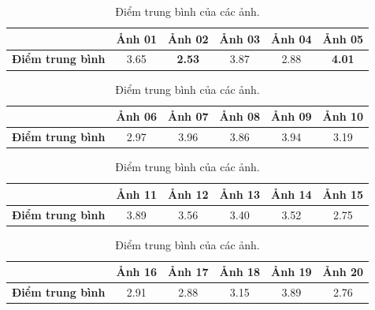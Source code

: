 \documentclass[a4paper, 12pt]{article}
\begin{document}
\begin{table}[!h]
\centering
\begin{tabular}{c|c|c|c|c|c|}
\cline{2-6}
                                               & \textbf{Ảnh 01} & \textbf{Ảnh 02} & \textbf{Ảnh 03} & \textbf{Ảnh 04} & \textbf{Ảnh 05} \\ \hline
\multicolumn{1}{|c|}{\textbf{Điểm trung bình}} & 3.65            & \textbf{2.53}            & 3.87            & 2.88            & \textbf{4.01}            \\ \hline
\end{tabular}

\begin{tabular}{c|c|c|c|c|c|}
\cline{2-6}
                                               & \textbf{Ảnh 06} & \textbf{Ảnh 07} & \textbf{Ảnh 08} & \textbf{Ảnh 09} & \textbf{Ảnh 10} \\ \hline
\multicolumn{1}{|c|}{\textbf{Điểm trung bình}} & 2.97            & 3.96            & 3.86            & 3.94            & 3.19            \\ \hline
\end{tabular}

\begin{tabular}{c|c|c|c|c|c|}
\cline{2-6}
                                               & \textbf{Ảnh 11} & \textbf{Ảnh 12} & \textbf{Ảnh 13} & \textbf{Ảnh 14} & \textbf{Ảnh 15} \\ \hline
\multicolumn{1}{|c|}{\textbf{Điểm trung bình}} & 3.89            & 3.56             & 3.40            & 3.52            & 2.75            \\ \hline
\end{tabular}

\begin{tabular}{c|c|c|c|c|c|}
\cline{2-6}
                                               & \textbf{Ảnh 16} & \textbf{Ảnh 17} & \textbf{Ảnh 18} & \textbf{Ảnh 19} & \textbf{Ảnh 20} \\ \hline
\multicolumn{1}{|c|}{\textbf{Điểm trung bình}} & 2.91            & 2.88            & 3.15            & 3.89            & 2.76            \\ \hline
\end{tabular}
\caption{Điểm trung bình của các ảnh.}
\label{tab:statsurvey}
\end{table}
\end{document}
